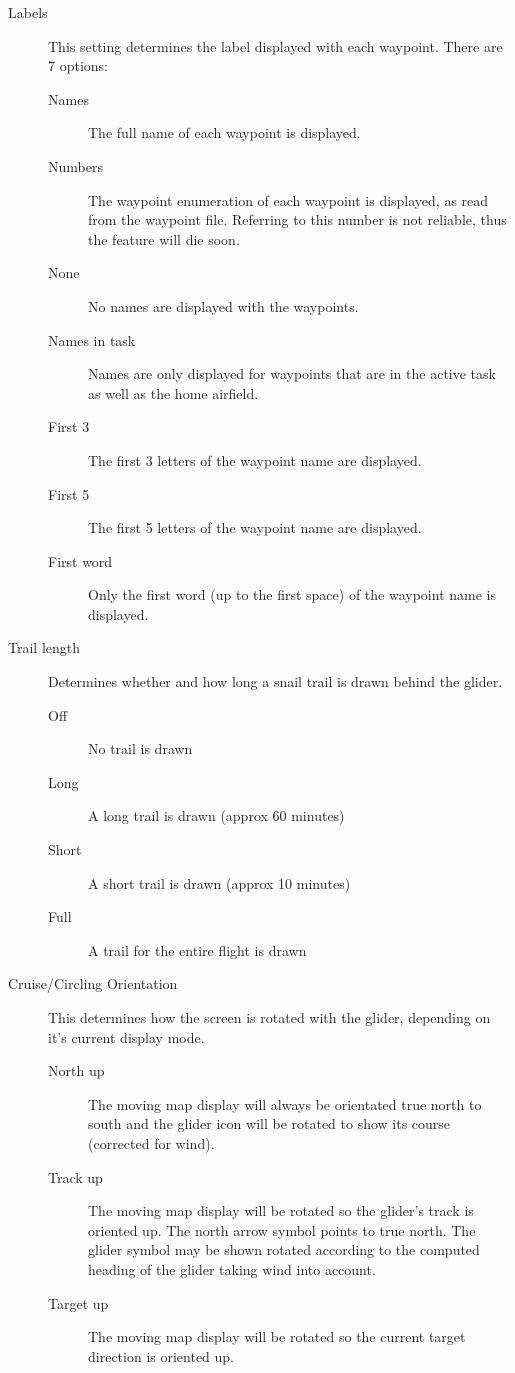 \documentclass[a4paper,12pt]{refrep}
\begin{document}
\begin{description}
\item[Labels] This setting \label{conf:labels} determines the label
displayed with each waypoint. There are 7 options:

\begin{description}
\item[Names] The full name of each waypoint is displayed.
\item[Numbers] The waypoint enumeration of each waypoint is displayed, as read
from the waypoint file. Referring to this number is not reliable, thus the
feature will die soon.
\item[None] No names are displayed with the waypoints.
\item[Names in task] Names are only displayed for waypoints that are in the active task as well as the home airfield.
\item[First 3] The first 3 letters of the waypoint name are displayed.
\item[First 5] The first 5 letters of the waypoint name are displayed.
\item[First word] Only the first word (up to the first space) of the waypoint name is displayed.
\end{description}

\item[Trail length] \label{conf:snailtrail} Determines whether and how long a
snail trail is drawn behind the glider.
\begin{description}
\item[Off] No trail is drawn
\item[Long] A long trail is drawn (approx 60 minutes)
\item[Short] A short trail is drawn (approx 10 minutes) 
\item[Full] A trail for the entire flight is drawn
\end{description}

\item[Cruise/Circling Orientation] \label{conf:orientation} This determines how
the screen is rotated with the glider, depending on it's current display mode.
\begin{description}
\item[North up] The moving map display will always be orientated true north to
south and the glider icon will be rotated to show its course (corrected for
wind).
\item[Track up] The moving map display will be rotated so the glider's track
 is oriented up. The north arrow symbol points to true north. The glider symbol 
 may be shown rotated according to the computed heading of the glider taking wind into account.
\item[Target up] The moving map display will be rotated so the current target
direction is oriented up.
\end{description}


\end{description}
\end{document}
